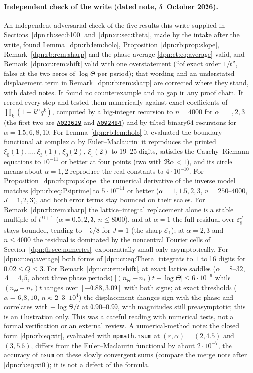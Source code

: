 \documentclass[11pt]{article}
\numberwithin{equation}{section}
\theoremstyle{definition}\newtheorem{definition}[theorem]{Definition}
\theoremstyle{remark}\newtheorem{remark}[theorem]{Remark}
\newcommand{\OEIS}[1]{\href{https://oeis.org/#1}{\texttt{#1}}}
\newcommand{\epsh}{\varepsilon_{\sharp}}
\begin{document}
\paragraph{Independent check of the write (dated note, 5~October 2026).}
An independent adversarial check of the five results this write supplied in
Sections~\ref{dpn:rb:sec:b100} and~\ref{dpn:ct:sec:theta}, made by the intake
after the write, found Lemma~\ref{dpn:rb:lem:holo},
Proposition~\ref{dpn:rb:prop:slope}, Remark~\ref{dpn:rb:rem:sharp} and the
phase average \eqref{dpn:ct:eq:average} valid, and
Remark~\ref{dpn:ct:rem:shift} valid with one overstatement (``of exact order
$1/t$'', false at the two zeros of $\log\Theta$ per period); that wording and
an understated displacement term in Remark~\ref{dpn:rb:rem:sharp} are
corrected where they stand, with dated notes.  It found no counterexample and
no gap in any proof chain.  It reread every step and tested them numerically
against exact coefficients of $\prod_k(1+k^\alpha q^k)$, computed by a
big-integer recursion to $n=4000$ for $\alpha=1,2,3$ (the first two are
\OEIS{A022629} and \OEIS{A092484}) and by tilted binary64 recursions for
$\alpha=1.5,6,8,10$.  For Lemma~\ref{dpn:rb:lem:holo} it evaluated the
boundary functional at complex $\alpha$ by Euler--Maclaurin: it reproduces
the printed $\xi_0(1),\dots,\xi_3(1)$, $\xi_0(2)$, $\xi_1(2)$ to 19--25 digits,
satisfies the Cauchy--Riemann equations to $10^{-11}$ or better at four points
(two with $\Re\alpha<1$), and its circle means about $\alpha=1,2$ reproduce the
real constants to $4\cdot10^{-10}$.  For
Proposition~\ref{dpn:rb:prop:slope} the numerical derivative of the inverse
model matches \eqref{dpn:rb:eq:Psiprime} to $5\cdot10^{-11}$ or better ($\alpha=1,1.5,2,3$,
$n=250$--$4000$, $J=1,2,3$), and both error terms stay bounded on their
scales.  For Remark~\ref{dpn:rb:rem:sharp} the lattice--integral replacement
alone is a stable multiple of $t^{D+1}$ ($\alpha=0.5,2,3$, $n\le8000$), and at
$\alpha=1$ the full residual over $\epsh^J$ stays bounded, tending to $-3/8$
for $J=1$ (the sharp $\mathcal E_1$); at $\alpha=2,3$ and $n\le4000$ the
residual is dominated by the noncentral Fourier cells of
Section~\ref{dpn:jh:sec:numerics}, exponentially small only asymptotically.
For \eqref{dpn:ct:eq:average} both forms of \eqref{dpn:ct:eq:Theta}
integrate to $1$ to 16 digits for $0.02\le Q\le3$.  For
Remark~\ref{dpn:ct:rem:shift}, at exact lattice saddles ($\alpha=8$--$32$,
$\Lambda=4,5$, about three phase periods)
$|(n_\Theta-n_*)t+\log\Theta|\le6\cdot10^{-6}$ while $(n_\Theta-n_*)t$ ranges
over $[-0.88,3.09]$ with both signs; at exact thresholds ($\alpha=6,8,10$,
$n\approx2$--$3\cdot10^4$) the displacement changes sign with the phase and
correlates with $-\log\Theta/t$ at $0.90$--$0.99$, with magnitudes still
preasymptotic; this is an illustration only.  This was a careful reading with numerical tests, not a
formal verification or an external review.  A numerical-method note: the
closed form \eqref{dpn:rb:eq:xir}, evaluated with \texttt{mpmath.nsum} at
$(r,\alpha)=(2,4.5)$ and $(3,5.5)$, differs from the Euler--Maclaurin functional
by about $2\cdot10^{-7}$, the accuracy of \texttt{nsum} on these slowly
convergent sums (compare the merge note after \eqref{dpn:rb:eq:xi0}); it is
not a defect of the formula.
\end{document}
